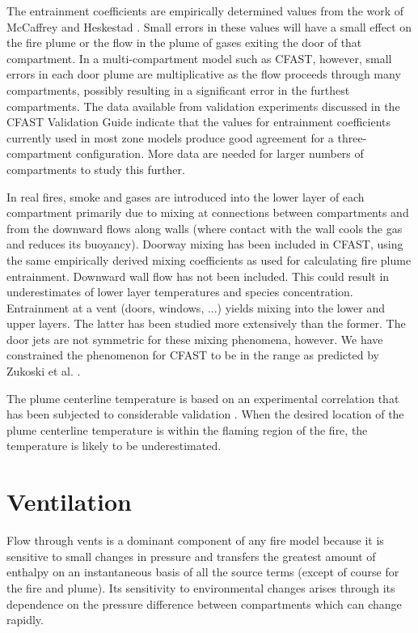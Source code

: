 The entrainment coefficients are empirically determined values from the work of McCaffrey \cite{McCaffrey:1983} and Heskestad \cite{Heskestad:1984}. Small errors in these values will have a small effect on the fire plume or the flow in the plume of gases exiting the door of that compartment.  In a multi-compartment model such as CFAST, however, small errors in each door plume are multiplicative as the flow proceeds through many compartments, possibly resulting in a significant error in the furthest compartments.  The data available from validation experiments \cite{Peacock:1988} discussed in the CFAST Validation Guide \cite{CFAST_Valid_Guide_6} indicate that the values for entrainment coefficients currently used in most zone models produce good agreement for a three-compartment configuration.  More data are needed for larger numbers of compartments to study this further.

In real fires, smoke and gases are introduced into the lower layer of each compartment primarily due to mixing at connections between compartments and from the downward flows along walls (where contact with the wall cools the gas and reduces its buoyancy).  Doorway mixing has been included in CFAST, using the same empirically derived mixing coefficients as used for calculating fire plume entrainment. Downward wall flow has not been included. This could result in underestimates of lower layer temperatures and species concentration. Entrainment at a vent (doors, windows, ...) yields mixing into the lower and upper layers. The latter has been studied more extensively than the former. The door jets are not symmetric for these mixing phenomena, however.  We have constrained the phenomenon for CFAST to be in the range as predicted by Zukoski et al. \cite{Zukoski:1985}.

The plume centerline temperature is based on an experimental correlation that has been subjected to considerable validation \cite{Valid:Davis_Plumes}. When the desired location of the plume centerline temperature is within the flaming region of the fire, the temperature is likely to be underestimated.




\chapter{Ventilation}

Flow through vents is a dominant component of any fire model because it is sensitive to small changes in pressure and transfers the greatest amount of enthalpy on an instantaneous basis of all the source terms (except of course for the fire and plume).  Its sensitivity to environmental changes arises through its dependence on the pressure difference between compartments which can change rapidly.

